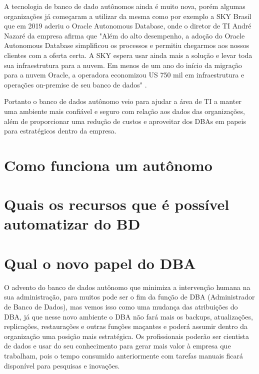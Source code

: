 A tecnologia de banco de dado autônomos ainda é muito nova, porém algumas organizações já começaram a utilizar da mesma como por exemplo a SKY Brasil que em 2019 aderiu o Oracle Autonomous Database, onde o diretor de TI André Nazaré da empresa afirma que "Além do alto desempenho, a adoção do Oracle Autonomous Database simplificou os processos e permitiu chegarmos aos nossos clientes com a oferta certa. A SKY espera usar ainda mais a solução e levar toda sua infraestrutura para a nuvem. Em menos de um ano do início da migração para a nuvem Oracle, a operadora economizou US 750 mil em infraestrutura e operações on-premise de seu banco de dados" . \cite{Sky}

Portanto o banco de dados autônomo veio para ajudar a área de TI a manter uma ambiente mais confiável e seguro com relação aos dados das organizações, além de proporcionar uma redução de custos e aproveitar dos DBAs em papeis para estratégicos dentro da empresa.



\section{Como funciona um autônomo}

\lipsum[1-2]


\section{Quais os recursos que é possível automatizar do BD}

\lipsum[1-2]

\lipsum[10-12]
\lipsum[10-12]
\lipsum[10-12]




\section{Qual o novo papel do DBA}

O advento do banco de dados autônomo que minimiza a intervenção humana na sua administração, para muitos pode ser o fim da função de DBA (Administrador de Banco de Dados), mas vemos isso como uma mudança das atribuições do DBA, já que nesse novo ambiente o DBA não fará mais os backups, atualizações, replicações, restaurações e outras funções maçantes e poderá assumir dentro da organização uma posição mais estratégica. Os profissionais poderão ser cientista de dados e usar do seu conhecimento para gerar mais valor à empresa que trabalham, pois o tempo consumido anteriormente com tarefas manuais ficará disponível para pesquisas e inovações.


